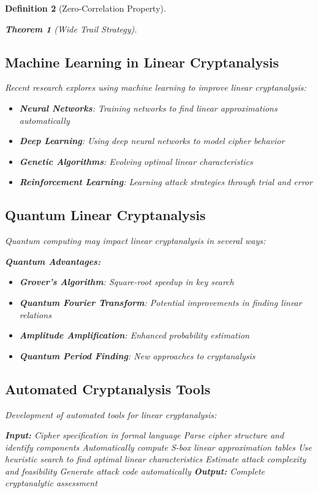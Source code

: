 \documentclass[12pt,a4paper]{article}
\newtheorem{theorem}{Theorem}[section]
\newtheorem{definition}[theorem]{Definition}
\begin{document}
\begin{definition}[Zero-Correlation Property]
\begin{theorem}[Wide Trail Strategy]
\subsection{Machine Learning in Linear Cryptanalysis}

Recent research explores using machine learning to improve linear cryptanalysis:

\begin{itemize}
    \item \textbf{Neural Networks}: Training networks to find linear approximations automatically
    \item \textbf{Deep Learning}: Using deep neural networks to model cipher behavior
    \item \textbf{Genetic Algorithms}: Evolving optimal linear characteristics
    \item \textbf{Reinforcement Learning}: Learning attack strategies through trial and error
\end{itemize}

\subsection{Quantum Linear Cryptanalysis}

Quantum computing may impact linear cryptanalysis in several ways:

\begin{mathematicsbox}
\textbf{Quantum Advantages:}
\begin{itemize}
    \item \textbf{Grover's Algorithm}: Square-root speedup in key search
    \item \textbf{Quantum Fourier Transform}: Potential improvements in finding linear relations
    \item \textbf{Amplitude Amplification}: Enhanced probability estimation
    \item \textbf{Quantum Period Finding}: New approaches to cryptanalysis
\end{itemize}
\end{mathematicsbox}

\subsection{Automated Cryptanalysis Tools}

Development of automated tools for linear cryptanalysis:

\begin{algorithmbox}[title=Automated Analysis Pipeline]
\begin{algorithmic}
\State \textbf{Input:} Cipher specification in formal language
\State Parse cipher structure and identify components
\State Automatically compute S-box linear approximation tables
\State Use heuristic search to find optimal linear characteristics
\State Estimate attack complexity and feasibility
\State Generate attack code automatically
\State \textbf{Output:} Complete cryptanalytic assessment
\end{algorithmic}
\end{algorithmbox}


\end{theorem}
\end{definition}
\end{document}
